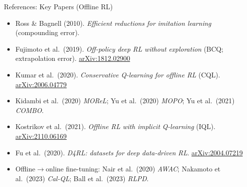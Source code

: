 \begin{frame}{References: Key Papers (Offline RL)}
\footnotesize
\begin{itemize}
    \item Ross \& Bagnell (2010). \emph{Efficient reductions for imitation
          learning} (compounding error).
    \item Fujimoto et al.\ (2019). \emph{Off-policy deep RL without exploration}
          (BCQ; extrapolation error). \href{https://arxiv.org/abs/1812.02900}{arXiv:1812.02900}
    \item Kumar et al.\ (2020). \emph{Conservative Q-learning for offline RL}
          (CQL). \href{https://arxiv.org/abs/2006.04779}{arXiv:2006.04779}
    \item Kidambi et al.\ (2020) \emph{MOReL}; Yu et al.\ (2020) \emph{MOPO};
          Yu et al.\ (2021) \emph{COMBO}.
    \item Kostrikov et al.\ (2021). \emph{Offline RL with implicit Q-learning}
          (IQL). \href{https://arxiv.org/abs/2110.06169}{arXiv:2110.06169}
    \item Fu et al.\ (2020). \emph{D4RL: datasets for deep data-driven RL}.
          \href{https://arxiv.org/abs/2004.07219}{arXiv:2004.07219}
    \item Offline$\to$online fine-tuning: Nair et al.\ (2020) \emph{AWAC};
          Nakamoto et al.\ (2023) \emph{Cal-QL}; Ball et al.\ (2023) \emph{RLPD}.
\end{itemize}
\end{frame}

